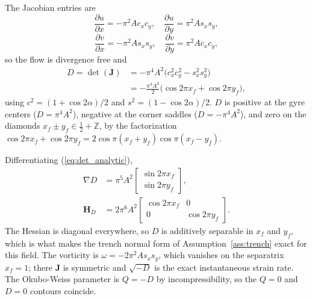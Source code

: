 \documentclass[lettersize,journal]{IEEEtran}
\begin{document}
The Jacobian entries are
\begin{equation}
    \frac{\partial u}{\partial x} = -\pi^2 A c_x c_y, \quad
    \frac{\partial u}{\partial y} =  \pi^2 A s_x s_y,
\end{equation}
\begin{equation}
    \frac{\partial v}{\partial x} = -\pi^2 A s_x s_y, \quad
    \frac{\partial v}{\partial y} =  \pi^2 A c_x c_y,
\end{equation}
so the flow is divergence free and
\begin{equation}
    \begin{split}
    D = \det(\mathbf{J})
      &= -\pi^4 A^2 \bigl(c_x^2 c_y^2 - s_x^2 s_y^2\bigr) \\
      &= -\frac{\pi^4 A^2}{2}\bigl(\cos 2\pi x_f + \cos 2\pi y_f\bigr),
    \end{split}
    \label{eq:det_analytic}
\end{equation}
using $c^2 = (1+\cos 2\alpha)/2$ and $s^2 = (1-\cos 2\alpha)/2$. $D$ is
positive at the gyre centers ($D = \pi^4 A^2$), negative at the corner
saddles ($D = -\pi^4 A^2$), and zero on the diamonds
$x_f \pm y_f \in \tfrac{1}{2} + \mathbb{Z}$, by the factorization
$\cos 2\pi x_f + \cos 2\pi y_f = 2\cos\pi(x_f+y_f)\cos\pi(x_f-y_f)$.

Differentiating (\ref{eq:det_analytic}),
\begin{equation}
    \begin{aligned}
    \nabla D &= \pi^5 A^2
    \begin{bmatrix} \sin 2\pi x_f \\ \sin 2\pi y_f \end{bmatrix},
    \\
    \mathbf{H}_D &= 2\pi^6 A^2
    \begin{bmatrix} \cos 2\pi x_f & 0 \\ 0 & \cos 2\pi y_f \end{bmatrix}.
    \end{aligned}
    \label{eq:gradhess_analytic}
\end{equation}
The Hessian is diagonal everywhere, so $D$ is additively separable in
$x_f$ and $y_f$, which is what makes the trench normal form of
Assumption~\ref{ass:trench} exact for this field. The vorticity is
$\omega = -2\pi^2 A s_x s_y$, which vanishes on the separatrix
$x_f = 1$; there $\mathbf{J}$ is symmetric and $\sqrt{-D}$ is the
exact instantaneous strain rate. The Okubo-Weiss parameter is
$Q = -D$ by incompressibility, so the $Q = 0$ and $D = 0$ contours
coincide.
\end{document}
